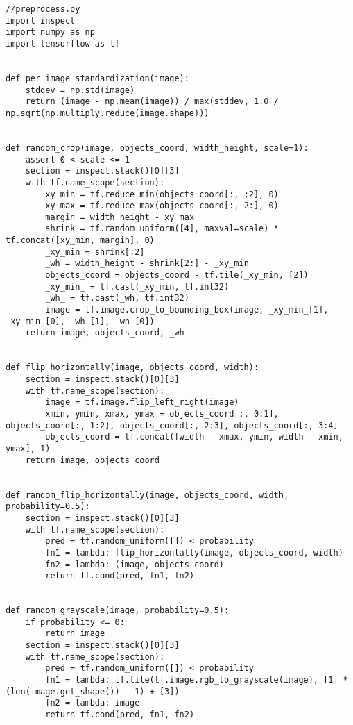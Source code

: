 \pagebreak
\begin{lstlisting}
//preprocess.py
import inspect
import numpy as np
import tensorflow as tf


def per_image_standardization(image):
    stddev = np.std(image)
    return (image - np.mean(image)) / max(stddev, 1.0 / np.sqrt(np.multiply.reduce(image.shape)))


def random_crop(image, objects_coord, width_height, scale=1):
    assert 0 < scale <= 1
    section = inspect.stack()[0][3]
    with tf.name_scope(section):
        xy_min = tf.reduce_min(objects_coord[:, :2], 0)
        xy_max = tf.reduce_max(objects_coord[:, 2:], 0)
        margin = width_height - xy_max
        shrink = tf.random_uniform([4], maxval=scale) * tf.concat([xy_min, margin], 0)
        _xy_min = shrink[:2]
        _wh = width_height - shrink[2:] - _xy_min
        objects_coord = objects_coord - tf.tile(_xy_min, [2])
        _xy_min_ = tf.cast(_xy_min, tf.int32)
        _wh_ = tf.cast(_wh, tf.int32)
        image = tf.image.crop_to_bounding_box(image, _xy_min_[1], _xy_min_[0], _wh_[1], _wh_[0])
    return image, objects_coord, _wh


def flip_horizontally(image, objects_coord, width):
    section = inspect.stack()[0][3]
    with tf.name_scope(section):
        image = tf.image.flip_left_right(image)
        xmin, ymin, xmax, ymax = objects_coord[:, 0:1], objects_coord[:, 1:2], objects_coord[:, 2:3], objects_coord[:, 3:4]
        objects_coord = tf.concat([width - xmax, ymin, width - xmin, ymax], 1)
    return image, objects_coord


def random_flip_horizontally(image, objects_coord, width, probability=0.5):
    section = inspect.stack()[0][3]
    with tf.name_scope(section):
        pred = tf.random_uniform([]) < probability
        fn1 = lambda: flip_horizontally(image, objects_coord, width)
        fn2 = lambda: (image, objects_coord)
        return tf.cond(pred, fn1, fn2)


def random_grayscale(image, probability=0.5):
    if probability <= 0:
        return image
    section = inspect.stack()[0][3]
    with tf.name_scope(section):
        pred = tf.random_uniform([]) < probability
        fn1 = lambda: tf.tile(tf.image.rgb_to_grayscale(image), [1] * (len(image.get_shape()) - 1) + [3])
        fn2 = lambda: image
        return tf.cond(pred, fn1, fn2)

\end{lstlisting}


